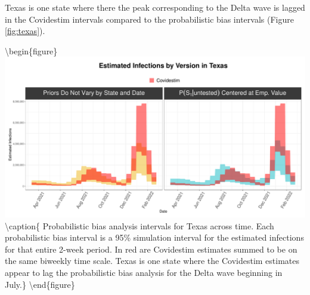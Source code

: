 \documentclass[12pt,twoside]{smiththesis}
\begin{document}
Texas is one state where there the peak corresponding to the Delta wave is lagged in the Covidestim intervals compared to the probabilistic bias intervals (Figure \ref{fig:texas}).

\textbackslash begin\{figure\}
\includegraphics[width=1\linewidth]{figure/texas-lag} \textbackslash caption\{\label{fig:texas} Probabilistic bias analysis intervals for Texas across time. Each probabilistic bias interval is a 95\% simulation interval for the estimated infections for that entire 2-week period. In red are Covidestim estimates summed to be on the same biweekly time scale. Texas is one state where the Covidestim estimates appear to lag the probabilistic bias analysis for the Delta wave beginning in July.\}\label{fig:unnamed-chunk-9}
\textbackslash end\{figure\}
\end{document}
